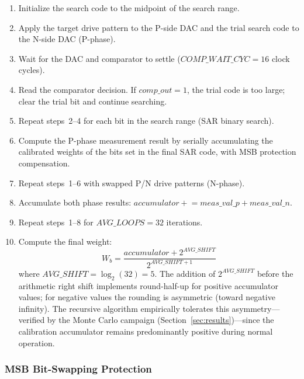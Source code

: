 \documentclass[journal]{IEEEtran}
\begin{document}
\begin{enumerate}
    \item Initialize the search code to the midpoint of the search range.
    \item Apply the target drive pattern to the P-side DAC and the trial
          search code to the N-side DAC (P-phase).
    \item Wait for the DAC and comparator to settle ($COMP\_WAIT\_CYC = 16$
          clock cycles).
    \item Read the comparator decision. If $comp\_out = 1$, the trial code is
          too large; clear the trial bit and continue searching.
    \item Repeat steps~2--4 for each bit in the search range (SAR binary
          search).
    \item Compute the P-phase measurement result by serially accumulating
          the calibrated weights of the bits set in the final SAR code, with
          MSB protection compensation.
    \item Repeat steps~1--6 with swapped P/N drive patterns (N-phase).
    \item Accumulate both phase results: $accumulator \mathrel{+}=
          meas\_val\_p + meas\_val\_n$.
    \item Repeat steps~1--8 for $AVG\_LOOPS = 32$ iterations.
    \item Compute the final weight:
          \begin{equation}
          W_b = \frac{accumulator + 2^{AVG\_SHIFT}}{2^{AVG\_SHIFT+1}}
          \label{eq:weight_avg}
          \end{equation}
          where $AVG\_SHIFT = \log_2(32) = 5$. The addition of $2^{AVG\_SHIFT}$
          before the arithmetic right shift implements round-half-up for
          positive accumulator values; for negative values the rounding is
          asymmetric (toward negative infinity). The recursive algorithm
          empirically tolerates this asymmetry---verified by the Monte Carlo
          campaign (Section~\ref{sec:results})---since the calibration
          accumulator remains predominantly positive during normal operation.
\end{enumerate}

\subsubsection{MSB Bit-Swapping Protection}
\end{document}
